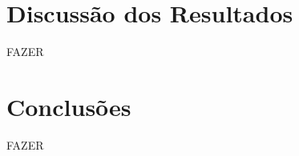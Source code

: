 \documentclass[
	12pt,				%
	oneside,   	        %
	a4paper,			%
	english,			%
	french,				%
	spanish,			%
	brazil,				%
	]{pacotes/abntex2}
\begin{document}
\section{Discussão dos Resultados}
\label{sec:discussao}

FAZER

\section{Conclusões}
\label{sec:conclusoes}

FAZER

\postextual
\renewcommand{\bibsection}{%
\section{\bibname}
\bibmark
\prebibhook}


\end{document}
